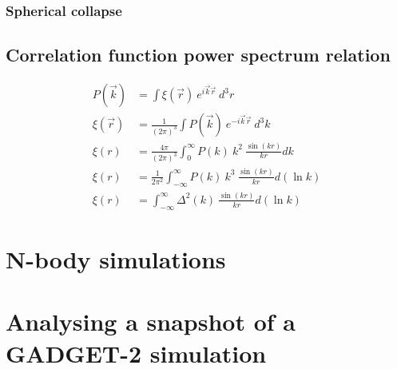 \documentclass[12pt,twocolumn]{article}
\begin{document}
\subsubsection{Spherical collapse}

\subsection{Correlation function power spectrum relation}

\begin{align}
P(\vec{k}) &= \int \xi(\vec{r}) ~e^{i \vec{k} \dot \vec{r}} ~d^3r\\
\xi(\vec{r}) &= \frac{1}{(2\pi)^3} \int P(\vec{k}) ~e^{-i \vec{k} \dot \vec{r}} ~d^3 k\\
\xi(r) &= \frac{4 \pi}{(2\pi)^3} \int_{0}^{\infty} P(k) ~k^2 ~\frac{\sin(kr)}{kr} dk\\
\xi(r) &= \frac{1}{2\pi^2} \int_{-\infty}^{\infty} P(k) ~k^3 ~\frac{\sin(kr)}{kr} d(\ln k)\\
\xi(r) &= \int_{-\infty}^{\infty} \Delta^2(k) ~\frac{\sin(kr)}{kr} d(\ln k)
\end{align}



\section{N-body simulations}

%


\section{Analysing a snapshot of a GADGET-2 simulation}
\cite{aseem_shadab}
\end{document}
